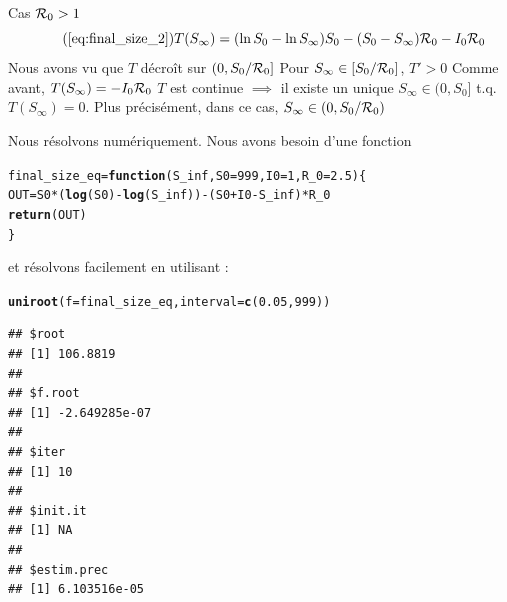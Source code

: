 \documentclass[aspectratio=169]{beamer}\usepackage[]{graphicx}\usepackage[]{xcolor}
\makeatletter
\newcommand{\hlnum}[1]{\textcolor[rgb]{0.686,0.059,0.569}{#1}}%
\newcommand{\hlopt}[1]{\textcolor[rgb]{0,0,0}{#1}}%
\newcommand{\hldef}[1]{\textcolor[rgb]{0.345,0.345,0.345}{#1}}%
\newcommand{\hlkwa}[1]{\textcolor[rgb]{0.161,0.373,0.58}{\textbf{#1}}}%
\newcommand{\hlkwb}[1]{\textcolor[rgb]{0.69,0.353,0.396}{#1}}%
\newcommand{\hlkwc}[1]{\textcolor[rgb]{0.333,0.667,0.333}{#1}}%
\newcommand{\hlkwd}[1]{\textcolor[rgb]{0.737,0.353,0.396}{\textbf{#1}}}%
\newenvironment{kframe}{%
 \def\at@end@of@kframe{}%
 \ifinner\ifhmode%
  \def\at@end@of@kframe{\end{minipage}}%
  \begin{minipage}{\columnwidth}%
 \fi\fi%
 \def\FrameCommand##1{\hskip\@totalleftmargin \hskip-\fboxsep
 \colorbox{shadecolor}{##1}\hskip-\fboxsep
     \hskip-\linewidth \hskip-\@totalleftmargin \hskip\columnwidth}%
 \MakeFramed {\advance\hsize-\width
   \@totalleftmargin\z@ \linewidth\hsize
   \@setminipage}}%
 {\par\unskip\endMakeFramed%
 \at@end@of@kframe}
\newenvironment{knitrout}{}{} %
\makeatother
\begin{document}
\begin{frame}{Cas $\mathcal{R}_0> 1$}
  \begin{equation}\tag{\ref{eq:final_size_2}}
    T(S_\infty) =(\ln S_0-\ln S_\infty)S_0
    - (S_0-S_\infty)\R_0 -I_0\R_0      
  \end{equation}
  \vfill
  \bbullet Nous avons vu que $T$ décroît sur $(0,S_0/\mathcal{R}_0]$
  \vfill
  \bbullet Pour $S_\infty\in[S_0/\mathcal{R}_0]$, $T'>0$
  \vfill
  \bbullet Comme avant, $T(S_\infty)=-I_0\mathcal{R}_0$
  \vfill
  \bbullet $T$ est continue
  \vfill
  $\implies$ il existe un unique $S_\infty\in (0,S_0]$ t.q. $T(S_\infty)=0$. Plus précisément, dans ce cas, $S_\infty\in(0,S_0/\mathcal{R}_0)$
\end{frame}



\begin{frame}[fragile]{}
Nous résolvons numériquement. Nous avons besoin d'une fonction
\begin{knitrout}
\color{fgcolor}\begin{kframe}
\begin{alltt}
\hldef{final_size_eq} \hlkwb{=} \hlkwa{function}\hldef{(}\hlkwc{S_inf}\hldef{,} \hlkwc{S0} \hldef{=} \hlnum{999}\hldef{,} \hlkwc{I0} \hldef{=} \hlnum{1}\hldef{,} \hlkwc{R_0} \hldef{=} \hlnum{2.5}\hldef{) \{}
  \hldef{OUT} \hlkwb{=} \hldef{S0}\hlopt{*}\hldef{(}\hlkwd{log}\hldef{(S0)}\hlopt{-}\hlkwd{log}\hldef{(S_inf))} \hlopt{-} \hldef{(S0}\hlopt{+}\hldef{I0}\hlopt{-}\hldef{S_inf)}\hlopt{*}\hldef{R_0}
  \hlkwd{return}\hldef{(OUT)}
\hldef{\}}
\end{alltt}
\end{kframe}
\end{knitrout}
et résolvons facilement en utilisant :
\begin{knitrout}
\color{fgcolor}\begin{kframe}
\begin{alltt}
\hlkwd{uniroot}\hldef{(}\hlkwc{f} \hldef{= final_size_eq,} \hlkwc{interval} \hldef{=} \hlkwd{c}\hldef{(}\hlnum{0.05}\hldef{,} \hlnum{999}\hldef{))}
\end{alltt}
\begin{verbatim}
## $root
## [1] 106.8819
## 
## $f.root
## [1] -2.649285e-07
## 
## $iter
## [1] 10
## 
## $init.it
## [1] NA
## 
## $estim.prec
## [1] 6.103516e-05
\end{verbatim}
\end{kframe}
\end{knitrout}
\end{frame}
\end{document}
